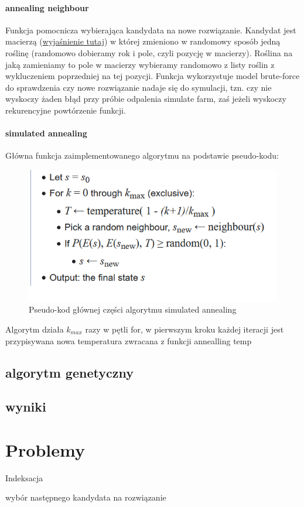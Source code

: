 \documentclass[12pt,a4paper]{article}
\begin{document}
\paragraph{annealing neighbour}
Funkcja pomocnicza wybierająca kandydata na nowe rozwiązanie. Kandydat jest macierzą (\hyperref[postac_rozw]{wyjaśnienie tutaj}) w której zmieniono w randomowy sposób jedną roślinę (randomowo dobieramy rok i pole, czyli pozycję w macierzy). Roślina na jaką zamieniamy to pole w macierzy wybieramy randomowo z listy roślin z wykluczeniem poprzedniej na tej pozycji.
Funkcja wykorzystuje model brute-force do sprawdzenia czy nowe rozwiązanie nadaje się do symulacji, tzn. czy nie wyskoczy żaden błąd przy próbie odpalenia simulate farm, zaś jeżeli wyskoczy rekurencyjne powtórzenie funkcji. 

	\paragraph{simulated annealing}
Główna funkcja zaimplementowanego algorytmu na podstawie pseudo-kodu:

\begin{figure}[H]
	\centering
	\includegraphics[width=1\linewidth]{screens/pseudocode}
	\caption{Pseudo-kod głównej części algorytmu simulated annealing}
	\label{fig:pseudocode}
\end{figure}


Algorytm działa $ k_{max} $ razy w pętli for, 
w pierwszym kroku każdej iteracji jest przypisywana nowa temperatura zwracana z funkcji annealling temp


\subsection{algorytm genetyczny}


\subsection{wyniki}





\section{Problemy}
Indeksacja

wybór następnego kandydata na rozwiązanie


	
\end{document}
